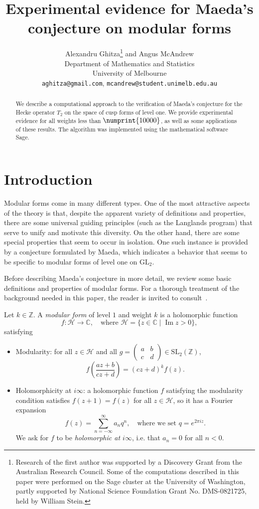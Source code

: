 \documentclass[11pt]{article}
\title{Experimental evidence for Maeda's conjecture on modular forms
}
\author{
Alexandru Ghitza\footnote{Research of the first author was supported by 
a Discovery Grant from the Australian Research Council.
Some of the computations described in this paper were performed on the Sage
cluster at the University of Washington, partly supported by National 
Science Foundation Grant No. DMS-0821725, held by William Stein.}  
{} and 
Angus McAndrew\\
Department of Mathematics and Statistics\\
University of Melbourne\\
{\tt aghitza@gmail.com}, {\tt mcandrew@student.unimelb.edu.au}
}
\date{}
\theoremstyle{plain}
\theoremstyle{definition}
\theoremstyle{remark}
\numberwithin{equation}{section}
\newcommand{\longto}{\longrightarrow}
\newcommand{\CC}{\mathbb{C}}
\newcommand{\ZZ}{\mathbb{Z}}
\newcommand{\cH}{\mathcal{H}}
\renewcommand{\Im}{\operatorname{Im}}
\newcommand{\bound}{\numprint{10000}}
\newcommand{\GL}{\mathrm{GL}}
\newcommand{\SL}{\mathrm{SL}}
\begin{document}
\thispagestyle{empty}

\maketitle
\begin{abstract}
  We describe a computational approach to the verification of Maeda's conjecture
  for the Hecke operator $T_2$ on the space of cusp forms of level one. We provide
  experimental evidence for all weights less than $\bound$, as well as some
  applications of these results.  The algorithm was implemented using the
  mathematical software Sage.
\end{abstract}


\section{Introduction}
\label{sect:introduction}
Modular forms come in many different types.  One of the most attractive
aspects of the theory is that, despite the apparent variety of definitions
and properties, there are some universal guiding principles (such as the
Langlands program) that serve to unify and motivate this diversity.  On the
other hand, there are some special properties that seem to occur in isolation.
One such instance is provided by a conjecture formulated by Maeda, which
indicates a behavior that seems to be specific to modular forms of level one
on $\GL_2$.  

Before describing Maeda's conjecture in more detail, we review some basic 
definitions and properties of modular forms.  For a thorough treatment of
the background needed in this paper, the reader is invited to
consult~\cite{Stein}.

Let $k\in\ZZ$.  A \emph{modular form} of level $1$ and weight $k$ is a
holomorphic function
\begin{equation*}
  f\colon\cH\longto\CC, \quad\text{where }
  \cH=\{z\in\CC\mid \Im z>0\},
\end{equation*}
satisfying
\begin{itemize}
  \item Modularity: for all $z\in\cH$ and all
    $g=\left(\begin{smallmatrix}a&b\\c&d\end{smallmatrix}\right)\in\SL_2(\ZZ)$,
      \begin{equation*}
        f\left(\frac{az+b}{cz+d}\right)=(cz+d)^kf(z).
      \end{equation*}
  \item Holomorphicity at $i\infty$: a holomorphic function $f$ satisfying the
    modularity condition satisfies $f(z+1)=f(z)$ for all $z\in\cH$, so it has
    a Fourier expansion
    \begin{equation*}
      f(z)=\sum_{n=-\infty}^\infty a_nq^n,\quad\text{where we set }
      q=e^{2\pi i z}.
    \end{equation*}
    We ask for $f$ to be \emph{holomorphic at $i\infty$}, i.e. that $a_n=0$
    for all $n<0$.
\end{itemize}
\end{document}
